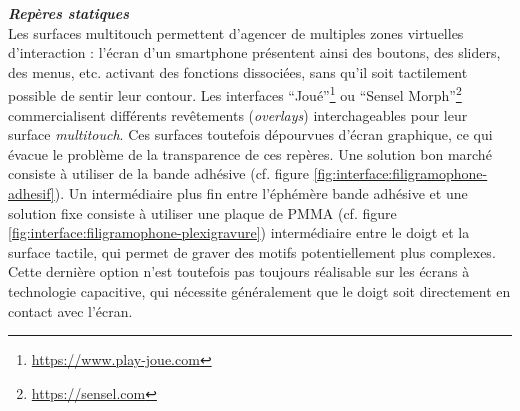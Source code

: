 \noindent\textbf{\textit{Repères statiques}}\\
\noindent Les surfaces multitouch permettent d'agencer de multiples zones virtuelles d'interaction : l'écran d'un smartphone présentent ainsi des boutons, des sliders, des menus, etc. activant des fonctions dissociées, sans qu'il soit tactilement possible de sentir leur contour. Les interfaces ``Joué''\footnote{\url{https://www.play-joue.com}} ou ``Sensel Morph''\footnote{\url{https://sensel.com}} commercialisent différents revêtements (\textit{overlays}) interchageables pour leur surface \textit{multitouch}. Ces surfaces toutefois dépourvues d'écran graphique, ce qui évacue le problème de la transparence de ces repères. Une solution bon marché consiste à utiliser de la bande adhésive (cf. figure \ref{fig:interface:filigramophone-adhesif}). Un intermédiaire plus fin entre l'éphémère bande adhésive et une solution fixe consiste à utiliser une plaque de \gls{PMMA} (cf. figure \ref{fig:interface:filigramophone-plexigravure}) intermédiaire entre le doigt et la surface tactile, qui permet de graver des motifs potentiellement plus complexes. Cette dernière option n'est toutefois pas toujours réalisable sur les écrans à technologie capacitive, qui nécessite généralement que le doigt soit directement en contact avec l'écran.
